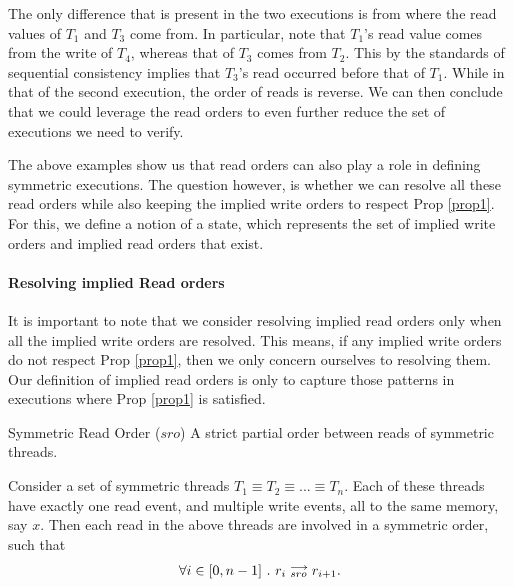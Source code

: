     The only difference that is present in the two executions is from where the read values of $T_1$ and $T_3$ come from.
    In particular, note that $T_1$'s read value comes from the write of $T_4$, whereas that of $T_3$ comes from $T_2$.
    This by the standards of sequential consistency implies that $T_3$'s read occurred before that of $T_1$.
    While in that of the second execution, the order of reads is reverse. 
    We can then conclude that we could leverage the read orders to even further reduce the set of executions we need to verify.  

    The above examples show us that read orders can also play a role in defining symmetric executions.
    The question however, is whether we can resolve all these read orders while also keeping the implied write orders to respect Prop \ref{prop1}.
    For this, we define a notion of a state, which represents the set of implied write orders and implied read orders that exist.    

    \paragraph{Resolving implied Read orders}

        It is important to note that we consider resolving implied read orders only when all the implied write orders are resolved.
        This means, if any implied write orders do not respect Prop \ref{prop1}, then we only concern ourselves to resolving them.
        Our definition of implied read orders is only to capture those patterns in executions where Prop \ref{prop1} is satisfied.
        
        \begin{definition}{Symmetric Read Order ($sro$)}
            \label{SymReadOrd}
            A strict partial order between reads of symmetric threads.
            
            Consider a set of symmetric threads $T_1 \equiv T_2 \equiv ... \equiv T_n$. 
            Each of these threads have exactly one read event, and multiple write events, all to the same memory, say $x$. 
            Then each read in the above threads are involved in a symmetric order, such that
            \begin{align*}
                \forall i \in [0, n-1] \ . \ r_i\stackrel{\longrightarrow}{_{sro}}r_{i+1}.
            \end{align*}

        \end{definition}

